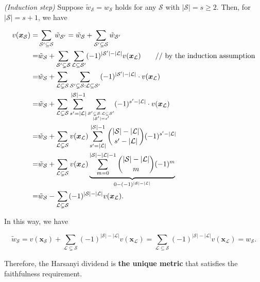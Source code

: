 \textit{(Induction step)} Suppose {\small$\tilde{w}_{\mathcal{S}} = w_{\mathcal{S}} $} holds for any {\small$\mathcal{S}$} with {\small$|\mathcal{S}|=s\geq 2$}. 
Then, for {\small$|\mathcal{S}|=s+1$}, we have

\begin{small}
\begin{align*}
 v(\boldsymbol{x}_{\mathcal{S}})  =& \sum_{\mathcal{S}'\subseteq \mathcal{S}} \tilde{w}_{\mathcal{S}'}  =  \tilde{w}_{\mathcal{S}}  + \sum_{\mathcal{S}'\subsetneq \mathcal{S}} \tilde{w}_{\mathcal{S}'} \\
=&  \tilde{w}_{\mathcal{S}}  + \sum_{\mathcal{S}'\subsetneq \mathcal{S}}\sum_{\mathcal{L}\subseteq \mathcal{S}'}(-1)^{|\mathcal{S}'|-|\mathcal{L}|} v(\boldsymbol{x}_{\mathcal{L}}) \qquad\text{// by the induction assumption}\\
=&  \tilde{w}_{\mathcal{S}}  + \sum_{\mathcal{L}\subsetneq \mathcal{S}}\sum_{\mathcal{S}'\subsetneq \mathcal{S}:\mathcal{L}\subseteq \mathcal{S}'} (-1)^{|\mathcal{S}'|-|\mathcal{L}|}\cdot  v(\boldsymbol{x}_{\mathcal{L}}) \\
=&  \tilde{w}_{\mathcal{S}}  + \sum_{\mathcal{L}\subsetneq \mathcal{S}}\sum_{s'=|\mathcal{L}|}^{|\mathcal{S}|-1}\sum_{\scriptsize\substack{\mathcal{S}'\subsetneq \mathcal{S}: \mathcal{L}\subseteq \mathcal{S}'\\|\mathcal{S}'|=s'}} (-1)^{s'-|\mathcal{L}|}\cdot  v(\boldsymbol{x}_{\mathcal{L}}) \\
=&  \tilde{w}_{\mathcal{S}}  + \sum_{\mathcal{L}\subsetneq \mathcal{S}}  v(\boldsymbol{x}_{\mathcal{L}})  \sum_{s'=|\mathcal{L}|}^{|\mathcal{S}|-1} \binom{|\mathcal{S}|-|\mathcal{L}|}{s'-|\mathcal{L}|} (-1)^{s'-|\mathcal{L}|}\\
=&  \tilde{w}_{\mathcal{S}}  + \sum_{\mathcal{L}\subsetneq \mathcal{S}}  v(\boldsymbol{x}_{\mathcal{L}})  \underbrace{\sum_{m=0}^{|\mathcal{S}|-|\mathcal{L}|-1} \binom{|\mathcal{S}|-|\mathcal{L}|}{m} (-1)^{m}}_{0-(-1)^{|\mathcal{S}|-|\mathcal{L}|}}\\
=&  \tilde{w}_{\mathcal{S}}  - \sum_{\mathcal{L}\subsetneq \mathcal{S}}(-1)^{|\mathcal{S}|-|\mathcal{L}|}  v(\boldsymbol{x}_{\mathcal{L}}) .
\end{align*}
\end{small}

In this way, we have 
\begin{small}
\begin{equation*}
     \tilde{w}_{\mathcal{S}}  =  v(\boldsymbol{x}_{\mathcal{S}})  + \sum_{\mathcal{L}\subsetneq \mathcal{S}}(-1)^{|\mathcal{S}|-|\mathcal{L}|}  v(\boldsymbol{x}_{\mathcal{L}})  = \sum_{\mathcal{L}\subseteq \mathcal{S}}(-1)^{|\mathcal{S}|-|\mathcal{L}|} v(\boldsymbol{x}_{\mathcal{L}})  =  w_{\mathcal{S}} .
\end{equation*}
\end{small}

Therefore, the Harsanyi dividend is \textbf{the unique metric} that satisfies the faithfulness requirement.
